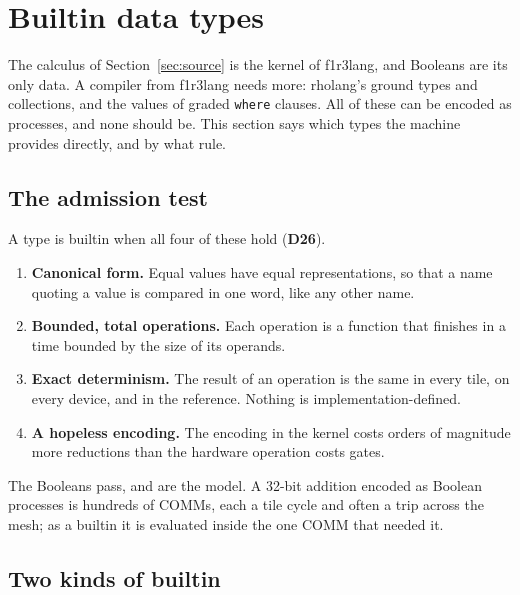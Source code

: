 \documentclass[11pt]{article}
\newcommand{\kw}[1]{\texttt{#1}}
\newcommand{\dec}[1]{\textbf{D#1}}
\theoremstyle{definition}
\theoremstyle{remark}
\begin{document}
\section{Builtin data types}\label{sec:data}

The calculus of Section~\ref{sec:source} is the kernel of f1r3lang, and
Booleans are its only data. A compiler from f1r3lang needs more: rholang's
ground types and collections, and the values of graded \kw{where} clauses.
All of these can be encoded as processes, and none should be. This section
says which types the machine provides directly, and by what rule.

\subsection{The admission test}\label{sec:admission}

A type is builtin when all four of these hold (\dec{26}).
\begin{enumerate}
\item \textbf{Canonical form.} Equal values have equal representations, so
that a name quoting a value is compared in one word, like any other name.
\item \textbf{Bounded, total operations.} Each operation is a function that
finishes in a time bounded by the size of its operands.
\item \textbf{Exact determinism.} The result of an operation is the same in
every tile, on every device, and in the reference. Nothing is
implementation-defined.
\item \textbf{A hopeless encoding.} The encoding in the kernel costs orders
of magnitude more reductions than the hardware operation costs gates.
\end{enumerate}
The Booleans pass, and are the model. A 32-bit addition encoded as Boolean
processes is hundreds of COMMs, each a tile cycle and often a trip across the
mesh; as a builtin it is evaluated inside the one COMM that needed it.

\subsection{Two kinds of builtin}\label{sec:kinds}
\end{document}
